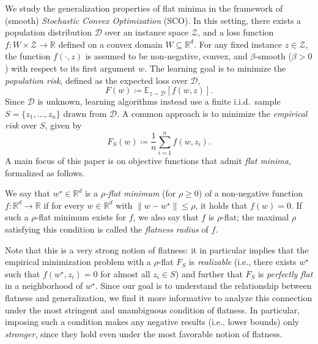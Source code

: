 \documentclass[11pt]{article}
\newcommand{\R}{\mathbb{R}}
\begin{document}
We study the generalization properties of flat minima in the framework of (smooth) \emph{Stochastic Convex Optimization} (SCO). 
In this setting, there exists a population distribution $\mathcal{D}$ over an instance space $\mathcal{Z}$, and a loss function 
$
f : W \times \mathcal{Z} \to \mathbb{R}
$
defined on a convex domain $W \subseteq \mathbb{R}^d$. 
For any fixed instance $z \in \mathcal{Z}$, the function $f(\cdot, z)$ is assumed to be non-negative, convex, and $\beta$-smooth ($\beta>0$) with respect to its first argument $w$.
The learning goal is to minimize the \emph{population risk}, defined as the expected loss over $\mathcal{D}$,
\begin{equation}
\label{def:population_risk}
    F(w) \coloneqq \mathbb{E}_{z \sim \mathcal{D}}[f(w,z)].
\end{equation}
Since $\mathcal{D}$ is unknown, learning algorithms instead use a finite i.i.d.\ sample $S = \{z_1, \ldots, z_n\}$ drawn from $\mathcal{D}$. 
A common approach is to minimize the \emph{empirical risk} over $S$, given by
\begin{equation}
\label{def:empirical_risk}
\textstyle
    F_S(w) \coloneqq \frac{1}{n}\sum_{i=1}^n f(w,z_i).
\end{equation}
A main focus of this paper is on objective functions that admit \emph{flat minima}, formalized as follows.
\begin{definition}
\label{ass:flat} \upshape
We say that $w^\star \in \mathbb{R}^d$ is a \emph{$\rho$-flat minimum} (for $\rho \geq 0$) of a non-negative function $f:\R^d \to \R$ if for every $w \in \R^d$ with $\|w - w^\star\| \leq \rho$, it holds that $f(w) = 0$.  
If such a $\rho$-flat minimum exists for $f$, we also say that $f$ is $\rho$-flat; the maximal $\rho$ satisfying this condition is called the \emph{flatness radius} of $f$. 
\end{definition}
Note that this is a very strong notion of flatness: it in particular implies that the empirical minimization problem with a $\rho$-flat $F_S$ is \emph{realizable} (i.e., there exists $w^\star$ such that $f(w^\star,z_i)=0$ for almost all $z_i \in S$) and further that $F_S$ is \emph{perfectly flat} in a neighborhood of $w^\star$.
Since our goal is to understand the relationship between flatness and generalization, we find it more informative to analyze this connection under the most stringent and unambiguous condition of flatness. In particular, imposing such a condition makes any negative results (i.e., lower bounds) only \emph{stronger}, since they hold even under the most favorable notion of flatness.
\end{document}

